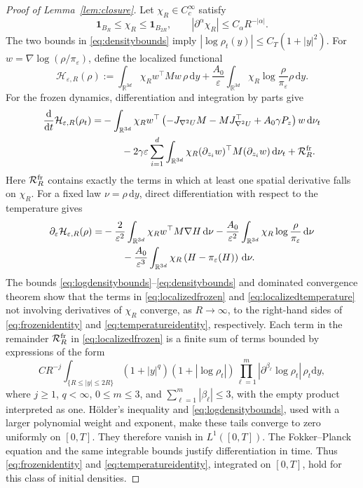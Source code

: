 \documentclass[11pt]{article}
\theoremstyle{definition}
\newcommand{\R}{\mathbb R}
\newcommand{\dd}{\mathrm d}
\newcommand{\cH}{\mathcal H}
\newcommand{\eps}{\varepsilon}
\begin{document}
\begin{proof}[Proof of Lemma~\ref{lem:closure}]
Let $\chi_R\in C_c^\infty$ satisfy
\[
 \mathbf 1_{B_R}\leq\chi_R\leq\mathbf 1_{B_{2R}},
 \qquad \left|\partial^\alpha\chi_R\right|\leq C_\alpha R^{-|\alpha|}.
\]
The two bounds in \eqref{eq:densitybounds} imply
$|\log\rho_t(y)|\leq C_T(1+|y|^2)$. For
$w=\nabla\log(\rho/\pi_\eps)$, define the localized functional
\[
 \cH_{\eps,R}(\rho)
 :=\int_{\R^{3d}}\chi_Rw^\top Mw\,\rho\,\dd y
 +\frac{A_0}{\eps}\int_{\R^{3d}}
   \chi_R\log\frac{\rho}{\pi_\eps}\rho\,\dd y.
\]
For the frozen dynamics, differentiation and integration by parts give
\begin{align}\label{eq:localizedfrozen}
 \frac{\dd}{\dd t}\cH_{\eps,R}(\rho_t)
 =&-\int_{\R^{3d}}\chi_R
 w^\top\left(-J_{\nabla^2U}M-MJ_{\nabla^2U}^\top
             +A_0\gamma P_z\right)w\,\dd\nu_t\notag\\
 &\qquad-2\gamma\eps\sum_{i=1}^d\int_{\R^{3d}}\chi_R
  (\partial_{z_i}w)^\top M(\partial_{z_i}w)\,\dd\nu_t
  +\mathcal R_R^{\rm fr}.
\end{align}
Here $\mathcal R_R^{\rm fr}$ contains exactly the terms in which at least one
spatial derivative falls on $\chi_R$. For a fixed law $\nu=\rho\,\dd y$,
direct differentiation with respect to the temperature gives
\begin{align}\label{eq:localizedtemperature}
 \partial_\eps\cH_{\eps,R}(\rho)
 =&-\frac{2}{\eps^2}\int_{\R^{3d}}
       \chi_Rw^\top M\nabla H\,\dd\nu
 -\frac{A_0}{\eps^2}\int_{\R^{3d}}
       \chi_R\log\frac{\rho}{\pi_\eps}\,\dd\nu\notag\\
 &\qquad-\frac{A_0}{\eps^3}\int_{\R^{3d}}
       \chi_R\left(H-\pi_\eps(H)\right)\,\dd\nu.
\end{align}
The bounds \eqref{eq:logdensitybounds}--\eqref{eq:densitybounds} and dominated
convergence theorem show that the terms in \eqref{eq:localizedfrozen} and
\eqref{eq:localizedtemperature} not involving derivatives of $\chi_R$
converge, as $R\to\infty$, to the right-hand sides of
\eqref{eq:frozenidentity} and \eqref{eq:temperatureidentity}, respectively.
Each term in the remainder $\mathcal R_R^{\rm fr}$ in
\eqref{eq:localizedfrozen}
is a finite sum of terms
bounded by expressions of the form
\[
 C R^{-j}\int_{\{R\leq|y|\leq2R\}}
 (1+|y|^q)(1+|\log\rho_t|)
 \prod_{\ell=1}^m\left|\partial^{\beta_\ell}\log\rho_t\right|\,\rho_t\dd y,
\]
where $j\geq1$, $q<\infty$, $0\leq m\leq3$, and
$\sum_{\ell=1}^m|\beta_\ell|\leq3$, with the empty product interpreted as one.
H\"older's inequality and
\eqref{eq:logdensitybounds}, used with a larger polynomial weight and exponent,
make these tails converge to zero uniformly on $[0,T]$. They therefore vanish
in $L^1([0,T])$. The Fokker--Planck equation and the same integrable bounds
justify differentiation in time. Thus \eqref{eq:frozenidentity} and
\eqref{eq:temperatureidentity}, integrated on $[0,T]$, hold for this class of
initial densities.


\end{proof}
\end{document}
